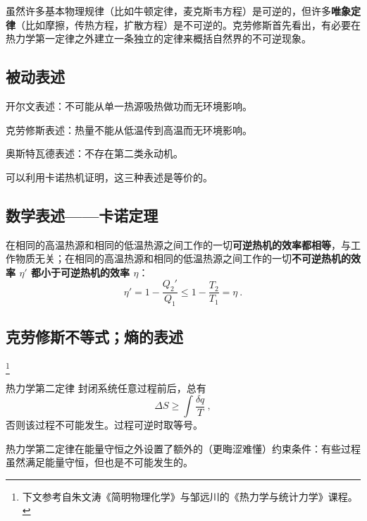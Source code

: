 
\begin{issues}
\issueDraft
\end{issues}


虽然许多基本物理规律（比如牛顿定律，麦克斯韦方程）是可逆的，但许多\textbf{唯象定律}（比如摩擦，传热方程，扩散方程）是不可逆的。克劳修斯首先看出，有必要在热力学第一定律之外建立一条独立的定律来概括自然界的不可逆现象。

\subsection{被动表述}
开尔文表述：不可能从单一热源吸热做功而无环境影响。

克劳修斯表述：热量不能从低温传到高温而无环境影响。

奥斯特瓦德表述：不存在第二类永动机。

可以利用卡诺热机证明，这三种表述是等价的。

\subsection{数学表述——卡诺定理}

在相同的高温热源和相同的低温热源之间工作的一切\textbf{可逆热机的效率都相等}，与工作物质无关；在相同的高温热源和相同的低温热源之间工作的一切\textbf{不可逆热机的效率 $\eta'$ 都小于可逆热机的效率 $\eta$}：
\begin{equation}
\eta'=1-\frac{Q_2'}{Q_1}\le 1-\frac{T_2}{T_1}=\eta~.
\end{equation}

\subsection{克劳修斯不等式；熵的表述}
\footnote{下文参考自朱文涛《简明物理化学》与邹远川的《热力学与统计力学》课程。}

\begin{theorem}{热力学第二定律}
封闭系统任意过程前后，总有
\begin{equation}
\Delta S \ge \int \frac{\delta q}{T}~,
\end{equation}
否则该过程不可能发生。过程可逆时取等号。
\end{theorem}
热力学第二定律在能量守恒之外设置了额外的（更晦涩难懂）约束条件：有些过程虽然满足能量守恒，但也是不可能发生的。


